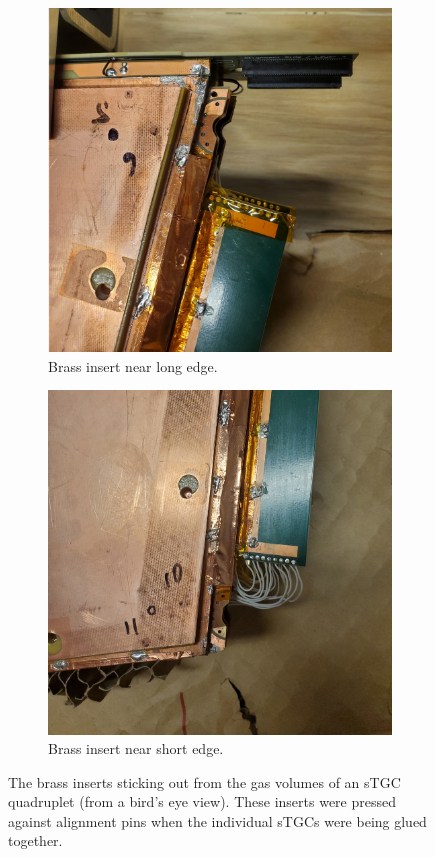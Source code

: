 \begin{figure}
\centering
\begin{subfigure}{.5\textwidth}
  \centering
  \includegraphics[width=\linewidth]{figures/brass_top.jpg}
  \caption{Brass insert near long edge.}
  \label{fig:brass_top}
\end{subfigure}%
\begin{subfigure}{.5\textwidth}
  \centering
  \includegraphics[width=\linewidth]{figures/brass_bottom.jpg}
  \caption{Brass insert near short edge.}
  \label{fig:brass_bottom}
\end{subfigure}
\caption{The brass inserts sticking out from the gas volumes of an sTGC quadruplet (from a bird's eye view). These inserts were pressed against alignment pins when the individual sTGCs were being glued together.}
\label{fig:brasses}
\end{figure}

